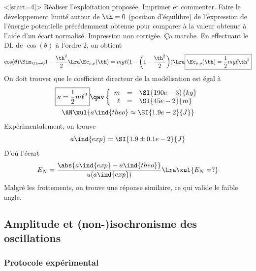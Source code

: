 \documentclass[../main/main.tex]{subfiles}
\begin{document}
\QR<[start=4]>{%
	Réaliser l'exploitation proposée. Imprimer et commenter. Faire le
	développement limité autour de $\th=0$ (position d'équilibre) de l'expression
	de l'énergie potentielle précédemment obtenue pour comparer à la valeur
	obtenue à l'aide d'un écart normalisé.
}{%
	Impression non corrigée. Ça marche. En effectuant le DL de $\cos(\theta)$ à
	l'ordre 2, on obtient
	\[
		\cos(\theta) \Sim_{\th \to 0} 1 - \frac{\th^{2}}{2}
		\Lra
		\Ec_{p,p}(\th) = mg \ell(1 - \left( 1 - \frac{\th^{2}}{2} \right))
		\Lra
		\boxed{\Ec_{p,p}(\th) = \frac{1}{2}mg \ell \th^{2}}
	\]
	On doit trouver que le coefficient directeur de la modélisation est égal à
	\begin{gather*}
		\boxed{a = \frac{1}{2}m \ell^{2}}
		\qav
		\left\{
		\begin{array}{rcl}
			m    & = & \SI{190e-3}{kg}
			\\
			\ell & = & \SI{45e-2}{m}
		\end{array}
		\right.\\
		\AN
		\xul{
			a\ind{theo} \approx \SI{1.9e-2}{J}
		}
	\end{gather*}
	Expérimentalement, on trouve
	\[
		a\ind{exp} = \SI{1.9\pm0.1e-2}{J}
	\]
	D'où l'écart
	\[
		E_N = \frac{\abs{a\ind{exp} - a\ind{theo}}}{u(a\ind{exp})}
		\Lra
		\xul{E_N = ?}
	\]
	Malgré les frottements, on trouve une réponse similaire, ce qui valide le
	faible angle.
}

\subsection{Amplitude et (non-)isochronisme des oscillations}

\subsubsection{Protocole expérimental}


\end{document}
